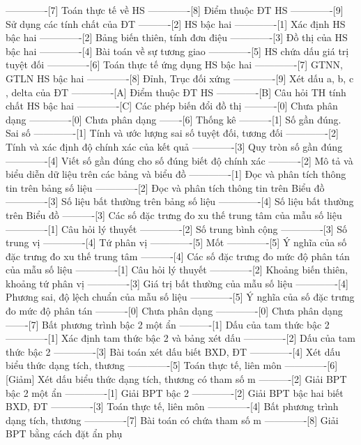 -------------[7] Toán thực tế về HS
-------------[8] Điểm thuộc ĐT HS
-------------[9] Sử dụng các tính chất của ĐT
----------[2] HS bậc hai
-------------[1] Xác định HS bậc hai
-------------[2] Bảng biến thiên, tính đơn điệu
-------------[3] Đồ thị của HS bậc hai
-------------[4] Bài toán về sự tương giao
-------------[5] HS chứa dấu giá trị tuyệt đối
-------------[6] Toán thực tế ứng dụng HS bậc hai
-------------[7] GTNN, GTLN HS bậc hai
-------------[8] Đỉnh, Trục đối xứng
-------------[9] Xét dấu a, b, c , delta của ĐT
-------------[A] Điểm thuộc ĐT HS
-------------[B] Câu hỏi TH tính chất HS bậc hai
-------------[C] Các phép biến đổi đồ thị 
----------[0] Chưa phân dạng
-------------[0] Chưa phân dạng
-------[6] Thống kê
----------[1] Số gần đúng. Sai số
-------------[1] Tính và ước lượng sai số tuyệt đối, tương đối
-------------[2] Tính và xác định độ chính xác của kết quả
-------------[3] Quy tròn số gần đúng
-------------[4] Viết số gần đúng cho số đúng biết độ chính xác
----------[2] Mô tả và biểu diễn dữ liệu trên các bảng và biểu đồ
-------------[1] Đọc và phân tích thông tin trên bảng số liệu
-------------[2] Đọc và phân tích thông tin trên Biểu đồ
-------------[3] Số liệu bất thường trên bảng số liệu
-------------[4] Số liệu bất thường trên Biểu đồ
----------[3] Các số đặc trưng đo xu thế trung tâm của mẫu số liệu
-------------[1] Câu hỏi lý thuyết
-------------[2] Số trung bình cộng
-------------[3] Số trung vị
-------------[4] Tứ phân vị
-------------[5] Mốt
-------------[5] Ý nghĩa của số đặc trưng đo xu thế trung tâm
----------[4] Các số đặc trưng đo mức độ phân tán của mẫu số liệu
-------------[1] Câu hỏi lý thuyết
-------------[2] Khoảng biến thiên, khoảng tứ phân vị
-------------[3] Giá trị bất thường của mẫu số liệu
-------------[4] Phương sai, độ lệch chuẩn của mẫu số liệu
-------------[5] Ý nghĩa của số đặc trưng đo mức độ phân tán
----------[0] Chưa phân dạng
-------------[0] Chưa phân dạng
-------[7] Bất phương trình bậc 2 một ẩn
----------[1] Dấu của tam thức bậc 2
-------------[1] Xác định tam thức bậc 2 và bảng xét dấu
-------------[2] Dấu của tam thức bậc 2
-------------[3] Bài toán xét dấu biết BXD, ĐT
-------------[4] Xét dấu biểu thức dạng tích, thương
-------------[5] Toán thực tế, liên môn
-------------[6] [Giảm] Xét dấu biểu thức dạng tích, thương có tham số m
----------[2] Giải BPT bậc 2 một ẩn
-------------[1] Giải BPT bậc 2
-------------[2] Giải BPT bậc hai biết BXD, ĐT
-------------[3] Toán thực tế, liên môn
-------------[4] Bất phương trình dạng tích, thương
-------------[7] Bài toán có chứa tham số m
-------------[8] Giải BPT bằng cách đặt ẩn phụ
